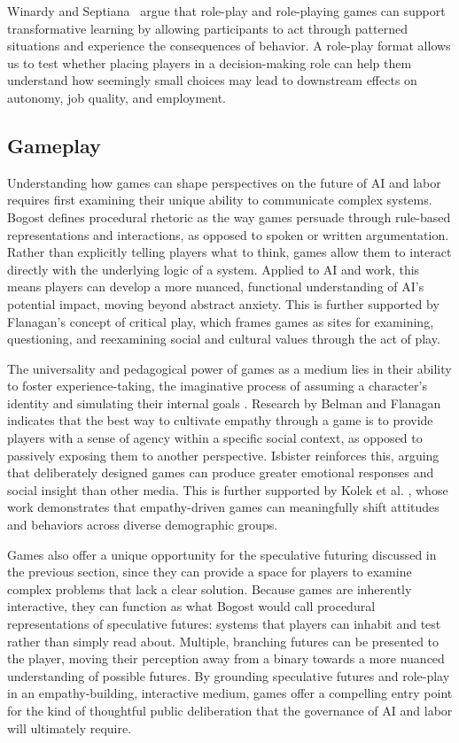 \documentclass[sigconf,authordraft]{acmart}
\begin{document}
Winardy and Septiana~\cite{winardy2023roleplay} argue that role-play and role-playing games can support transformative learning by allowing participants to act through patterned situations and experience the consequences of behavior. A role-play format allows us to test whether placing players in a decision-making role can help them understand how seemingly small choices may lead to downstream effects on autonomy, job quality, and employment.


\subsection{Gameplay}

Understanding how games can shape perspectives on the future of AI and labor requires first examining their unique ability to communicate complex systems. Bogost \cite{bogost2007persuasive} defines procedural rhetoric as the way games persuade through rule-based representations and interactions, as opposed to spoken or written argumentation. Rather than explicitly telling players what to think, games allow them to interact directly with the underlying logic of a system. Applied to AI and work, this means players can develop a more nuanced, functional understanding of AI's potential impact, moving beyond abstract anxiety. This is further supported by Flanagan's \cite{flanagan2009critical} concept of critical play, which frames games as sites for examining, questioning, and reexamining social and cultural values through the act of play.

The universality and pedagogical power of games as a medium lies in their ability to foster experience-taking, the imaginative process of assuming a character's identity and simulating their internal goals \cite{kaufman2012experience}. Research by Belman and Flanagan \cite{belman2010empathy} indicates that the best way to cultivate empathy through a game is to provide players with a sense of agency within a specific social context, as opposed to passively exposing them to another perspective. Isbister \cite{isbister2016games} reinforces this, arguing that deliberately designed games can produce greater emotional responses and social insight than other media. This is further supported by Kolek et al. \cite{kolek2024video}, whose work demonstrates that empathy-driven games can meaningfully shift attitudes and behaviors across diverse demographic groups.

Games also offer a unique opportunity for the speculative futuring discussed in the previous section, since they can provide a space for players to examine complex problems that lack a clear solution. Because games are inherently interactive, they can function as what Bogost \cite{bogost2007persuasive} would call procedural representations of speculative futures: systems that players can inhabit and test rather than simply read about. Multiple, branching futures can be presented to the player, moving their perception away from a binary towards a more nuanced understanding of possible futures. By grounding speculative futures and role-play in an empathy-building, interactive medium, games offer a compelling entry point for the kind of thoughtful public deliberation that the governance of AI and labor will ultimately require.
\end{document}
